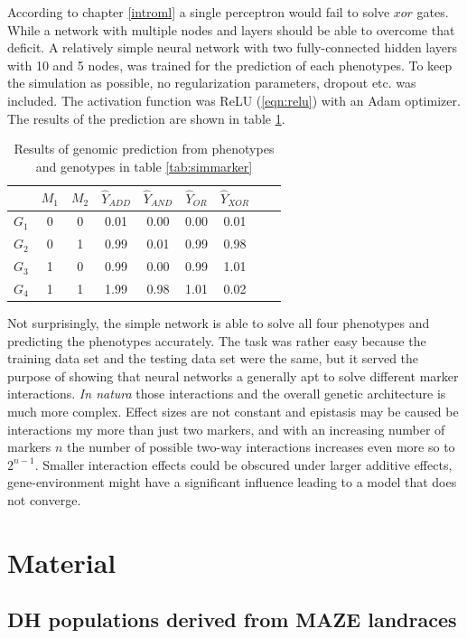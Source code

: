 According to chapter \ref{introml} a single perceptron would fail to solve $xor$ gates. While a network with
multiple nodes and layers should be able to overcome that deficit. A relatively simple neural network with two
fully-connected hidden layers with 10 and 5 nodes, was trained for the prediction of each phenotypes. To keep
the simulation as possible, no regularization parameters, dropout etc. was included. The activation function
was ReLU (\ref{eqn:relu}) with an Adam optimizer. The results of the prediction are shown in table
\ref{tab:simgpres}.

\begin{table}[H]
\caption{Results of genomic prediction from phenotypes and genotypes in table \ref{tab:simmarker}}
\label{tab:simgpres}
\centering
\begin{tabular}{ l c c | c c c c c c }
  \toprule
  & $M_1$ & $M_2$ & $\hat{Y}_{ADD}$ & $\hat{Y}_{AND}$ & $\hat{Y}_{OR}$ & $\hat{Y}_{XOR}$\\
  \midrule
  \hline 
  $G_1$ & 0 & 0 & 0.01 & 0.00 & 0.00 & 0.01 \\
  $G_2$ & 0 & 1 & 0.99 & 0.01 & 0.99 & 0.98 \\
  $G_3$ & 1 & 0 & 0.99 & 0.00 & 0.99 & 1.01 \\
  $G_4$ & 1 & 1 & 1.99 & 0.98 & 1.01 & 0.02 \\
  \bottomrule
\end{tabular}
\end{table}


Not surprisingly, the simple network is able to solve all four phenotypes and predicting the phenotypes
accurately. The task was rather easy because the training data set and the testing data set were the same, but
it served the purpose of showing that neural networks a generally apt to solve different marker
interactions. \textit{In natura} those interactions and the overall genetic architecture is much more
complex. Effect sizes are not constant and epistasis may be caused be interactions my more than just two
markers, and with an increasing number of markers $n$ the number of possible two-way interactions increases
even more so to $2^{n-1}$. Smaller interaction effects could be obscured under larger additive effects,
gene-environment might have a significant influence leading to a model that does not converge.


\section{Material}
\subsection{DH populations derived from MAZE landraces}
